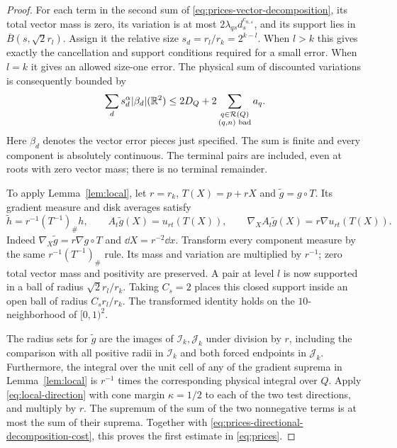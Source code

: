 \begin{proof}
For each term in the second sum of
\eqref{eq:prices-vector-decomposition}, its total vector mass is
zero, its variation is at most
$2\lambda_{qs}d_s^{c_{n,\varepsilon}}$, and its support lies in
$\overline B(s,\sqrt2r_l)$. Assign it the relative size
$s_d=r_l/r_k=2^{k-l}$. When $l>k$ this gives exactly the
cancellation and support conditions required for a small error.
When $l=k$ it gives an allowed size-one error. The physical
sum of discounted variations is consequently bounded by
\begin{equation}
 \sum_d s_d^\alpha|\beta_d|(\mathbb R^2)
 \le2D_Q+
       2\sum_{\substack{q\in\mathcal R(Q)\\(q,n)\text{ bad}}}a_q.
 \label{eq:prices-directional-decomposition-cost}
\end{equation}
Here $\beta_d$ denotes the vector error pieces just specified.
The sum is finite and every component is absolutely continuous.
The terminal pairs are included, even at roots with zero vector
mass; there is no terminal remainder.

To apply Lemma~\ref{lem:local}, let $r=r_k$,
$T(X)=p+rX$ and $\widetilde g=g\circ T$. Its gradient measure
and disk averages satisfy
\begin{equation}\label{eq:prices-scaling}
 \widetilde h=r^{-1}(T^{-1})_\#h,
 \qquad A_t\widetilde g(X)=u_{rt}(T(X)),
 \qquad \nabla_XA_t\widetilde g(X)=r\nabla u_{rt}(T(X)).
\end{equation}
Indeed $\nabla_X\widetilde g=r\nabla g\circ T$ and
$\dd X=r^{-2}\dd x$. Transform every component measure by
the same $r^{-1}(T^{-1})_\#$ rule. Its mass and variation
are multiplied by $r^{-1}$; zero total vector mass and positivity
are preserved. A pair at level $l$ is now supported in a ball
of radius $\sqrt2r_l/r_k$. Taking $C_s=2$ places this closed
support inside an open ball of radius $C_s r_l/r_k$. The
transformed identity holds on the
$10$-neighborhood of $[0,1)^2$.

The radius sets for $\widetilde g$ are the images of
$\mathcal I_k,\mathcal J_k$ under division by $r$, including
the comparison with all positive radii in $\mathcal I_k$ and
both forced endpoints in $\mathcal J_k$. Furthermore, the
integral over the unit cell of any of the gradient suprema
in Lemma~\ref{lem:local} is $r^{-1}$ times the corresponding
physical integral over $Q$. Apply
\eqref{eq:local-direction} with cone margin $\kappa=1/2$
to each of the two test directions, and multiply by $r$.
The supremum of the sum of the two nonnegative terms is at
most the sum of their suprema. Together with
\eqref{eq:prices-directional-decomposition-cost}, this proves
the first estimate in \eqref{eq:prices}.


\end{proof}
